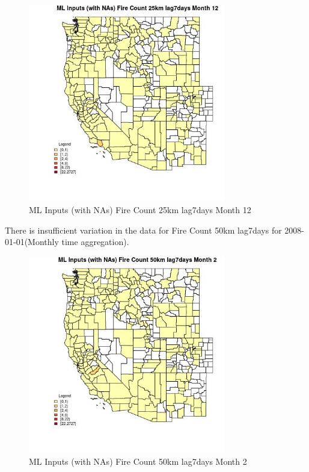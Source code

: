 \begin{figure} 
\centering  
\includegraphics[width=0.77\textwidth]{Code_Outputs/Report_ML_input_PM25_Step4_part_f_de_duplicated_aveswNAs_CountyFire_Count_25km_lag7daysmedianMonth12.jpg} 
\caption{\label{fig:Report_ML_input_PM25_Step4_part_f_de_duplicated_aveswNAsCountyFire_Count_25km_lag7daysmedianMonth12}ML Inputs (with NAs) Fire Count 25km lag7days Month 12} 
\end{figure} 
 

There is insufficient variation in the data for Fire Count 50km lag7days for 2008-01-01(Monthly time aggregation). 
 

\begin{figure} 
\centering  
\includegraphics[width=0.77\textwidth]{Code_Outputs/Report_ML_input_PM25_Step4_part_f_de_duplicated_aveswNAs_CountyFire_Count_50km_lag7daysmedianMonth2.jpg} 
\caption{\label{fig:Report_ML_input_PM25_Step4_part_f_de_duplicated_aveswNAsCountyFire_Count_50km_lag7daysmedianMonth2}ML Inputs (with NAs) Fire Count 50km lag7days Month 2} 
\end{figure} 
 

